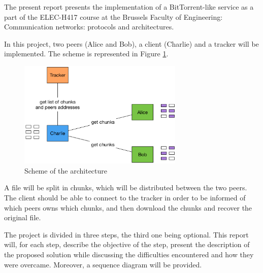 The present report presents the implementation of a BitTorrent-like service as a part of the ELEC-H417 course at the Brussels Faculty of Engineering: Communication networks: protocols and architectures.

In this project, two peers (Alice and Bob), a client (Charlie) and a tracker will be implemented. The scheme is represented in Figure \ref{fig:scheme}. 

\begin{figure}[h]
    \centering
    \includegraphics[width = 0.7\textwidth]{img/scheme.png}
    \caption{Scheme of the architecture}
    \label{fig:scheme}
\end{figure}

A file will be split in chunks, which will be distributed between the two peers. The client should be able to connect to the tracker in order to be informed of which peers owns which chunks, and then download the chunks and recover the original file.

The project is divided in three steps, the third one being optional. This report will, for each step, describe the objective of the step, present the description of the proposed solution while discussing the difficulties encountered and how they were overcame. Moreover, a sequence diagram will be provided.
